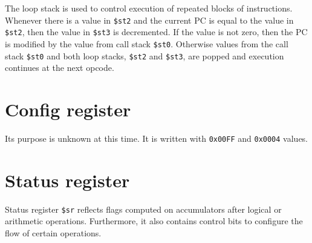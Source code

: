 \documentclass[oneside,english,a4paper,10pt,oneside,openany,final]{memoir}
\newcommand{\Register}[1]{\texttt{#1}}
\newcommand{\Value}[1]{\texttt{#1}}
\begin{document}
The loop stack is used to control execution of repeated blocks of instructions. Whenever there is a value in
\Register{\$st2} and the current PC is equal to the value in \Register{\$st2}, then the value in \Register{\$st3} is decremented.
If the value is not zero, then the PC is modified by the value from call stack \Register{\$st0}. Otherwise values from the call stack
\Register{\$st0} and both loop stacks, \Register{\$st2} and \Register{\$st3}, are popped and execution continues at the next opcode.

\pagebreak{}

\section{Config register}

Its purpose is unknown at this time. It is written with \Value{0x00FF} and \Value{0x0004} values.

\pagebreak{}

\section{Status register}

Status register \Register{\$sr} reflects flags computed on accumulators after logical or arithmetic operations.
Furthermore, it also contains control bits to configure the flow of certain operations.
\end{document}

